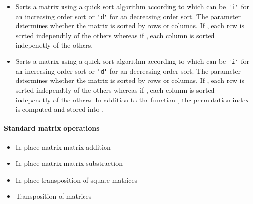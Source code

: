 \begin{itemize}
\item {}
  \sshortdescribe Sorts a matrix using a quick sort algorithm according to
   which can be \verb!'i'! for an increasing order sort or
  \verb!'d'! for an decreasing order sort. The parameter  determines
  whether the matrix is sorted by rows or columns. If , each row
  is sorted independtly of the others whereas if , each column
  is sorted independtly of the others.

\item {}
  \sshortdescribe Sorts a matrix using a quick sort algorithm according to
   which can be \verb!'i'! for an increasing order sort or
  \verb!'d'! for an decreasing order sort. The parameter  determines
  whether the matrix is sorted by rows or columns. If , each row
  is sorted independtly of the others whereas if , each column
  is sorted independtly of the others. In addition to the function
  , the permutation index is computed and stored into 
  .
\end{itemize}


\paragraph{Standard matrix operations}
\begin{itemize}
\item {} 
  \sshortdescribe In-place matrix matrix addition  

\item {} 
  \sshortdescribe In-place matrix matrix substraction  
  
\item {}
  \sshortdescribe In-place transposition of square matrices  

\item {} 
  \sshortdescribe Transposition of matrices
\end{itemize}

